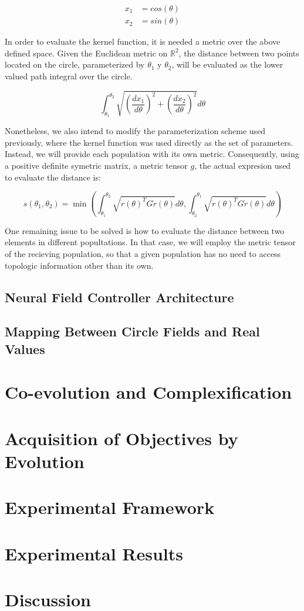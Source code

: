 \begin{align}
 x_1 &= cos(\theta)\\
 x_2 &= sin(\theta)
\end{align}

In order to evaluate the kernel function, it is needed a metric over the above defined space. Given the Euclidean metric on $\mathbb{R}^2$, the distance between two points located on the circle, parameterized by $\theta_1$ y $\theta_2$, will be evaluated as the lower valued path integral over the circle. 

\begin{equation}
 \int_{\theta_1}^{\theta_2}\sqrt{\left(\frac{dx_1}{d\theta}\right)^2 + \left(\frac{dx_2}{d\theta}\right)^2}d\theta
\end{equation}

Nonetheless, we also intend to modify the parameterization scheme used previously, where the kernel function was used directly as the set of parameters. Instead, we will provide each population with its own metric. Consequently, using a positive definite symetric matrix, a metric tensor $g$, the actual expresion used to evaluate the distance is:

\begin{equation}
 s(\theta_1,\theta_2)=\min\left(\int_{\theta_1}^{\theta_2}\sqrt{\dot{r}(\theta)^TG\dot{r}(\theta)}d\theta,\int_{\theta_2}^{\theta_1}\sqrt{\dot{r}(\theta)^TG\dot{r}(\theta)}d\theta\right)
\end{equation}

One remaining issue to be solved is how to evaluate the distance between two elements in different popultations. In that case, we will employ the metric tensor of the recieving population, so that a given population has no need to access topologic information other than its own.
 
\subsection{Neural Field Controller Architecture}

\subsection{Mapping Between Circle Fields and Real Values}

\section{Co-evolution and Complexification}
\label{sec:chp3-coevolution}

\section{Acquisition of Objectives by Evolution}
\label{sec:chp3-acquisition}

\section{Experimental Framework}
\label{sec:chp3-experimental}

\section{Experimental Results}
\label{sec:chp3-results}

\section{Discussion}
\label{sec:chp3-discussion}